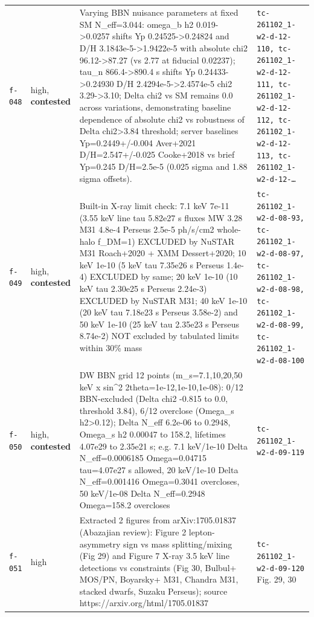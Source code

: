 \documentclass[11pt,a4paper]{article}
\begin{document}
\begin{longtable}{@{}p{}p{}p{}p{}@{}}
\texttt{f-048} & high, \textbf{contested} & Varying BBN nuisance parameters at fixed SM N\_eff=3.044: omega\_b h2 0.019-\textgreater{}0.0257 shifts Yp 0.24525-\textgreater{}0.24824 and D/H 3.1843e-5-\textgreater{}1.9422e-5 with absolute chi2 96.12-\textgreater{}87.27 (vs 2.77 at fiducial 0.02237); tau\_n 866.4-\textgreater{}890.4 s shifts Yp 0.24433-\textgreater{}0.24930 D/H 2.4294e-5-\textgreater{}2.4574e-5 chi2 3.29-\textgreater{}3.10; Delta chi2 vs SM remains 0.0 across variations, demonstrating baseline dependence of absolute chi2 vs robustness of Delta chi2\textgreater{}3.84 threshold; server baselines Yp=0.2449+/-0.004 Aver+2021 D/H=2.547+/-0.025 Cooke+2018 vs brief Yp=0.245 D/H=2.5e-5 (0.025 sigma and 1.88 sigma offsets). & \texttt{tc-261102\_\allowbreak{}1-w2-d-12-110,\allowbreak{} tc-261102\_\allowbreak{}1-w2-d-12-111,\allowbreak{} tc-261102\_\allowbreak{}1-w2-d-12-112,\allowbreak{} tc-261102\_\allowbreak{}1-w2-d-12-113,\allowbreak{} tc-261102\_\allowbreak{}1-w2-d-12-\ldots{}\allowbreak{}} \\
\texttt{f-049} & high, \textbf{contested} & Built-in X-ray limit check: 7.1 keV 7e-11 (3.55 keV line tau 5.82e27 s fluxes MW 3.28 M31 4.8e-4 Perseus 2.5e-5 ph/s/cm2 whole-halo f\_DM=1) EXCLUDED by NuSTAR M31 Roach+2020 + XMM Dessert+2020; 10 keV 1e-10 (5 keV tau 7.35e26 s Perseus 1.4e-4) EXCLUDED by same; 20 keV 1e-10 (10 keV tau 2.30e25 s Perseus 2.24e-3) EXCLUDED by NuSTAR M31; 40 keV 1e-10 (20 keV tau 7.18e23 s Perseus 3.58e-2) and 50 keV 1e-10 (25 keV tau 2.35e23 s Perseus 8.74e-2) NOT excluded by tabulated limits within 30\% mass & \texttt{tc-261102\_\allowbreak{}1-w2-d-08-93,\allowbreak{} tc-261102\_\allowbreak{}1-w2-d-08-97,\allowbreak{} tc-261102\_\allowbreak{}1-w2-d-08-98,\allowbreak{} tc-261102\_\allowbreak{}1-w2-d-08-99,\allowbreak{} tc-261102\_\allowbreak{}1-w2-d-08-100} \\
\texttt{f-050} & high, \textbf{contested} & DW BBN grid 12 points (m\_s=7.1,10,20,50 keV x sin\textasciicircum{}2 2theta=1e-12,1e-10,1e-08): 0/12 BBN-excluded (Delta chi2 -0.815 to 0.0, threshold 3.84), 6/12 overclose (Omega\_s h2\textgreater{}0.12); Delta N\_eff 6.2e-06 to 0.2948, Omega\_s h2 0.00047 to 158.2, lifetimes 4.07e29 to 2.35e21 s; e.g. 7.1 keV/1e-10 Delta N\_eff=0.0006185 Omega=0.04715 tau=4.07e27 s allowed, 20 keV/1e-10 Delta N\_eff=0.001416 Omega=0.3041 overcloses, 50 keV/1e-08 Delta N\_eff=0.2948 Omega=158.2 overcloses & \texttt{tc-261102\_\allowbreak{}1-w2-d-09-119} \\
\texttt{f-051} & high & Extracted 2 figures from arXiv:1705.01837 (Abazajian review): Figure 2 lepton-asymmetry sign vs mass splitting/mixing (Fig 29) and Figure 7 X-ray 3.5 keV line detections vs constraints (Fig 30, Bulbul+ MOS/PN, Boyarsky+ M31, Chandra M31, stacked dwarfs, Suzaku Perseus); source https://arxiv.org/html/1705.01837 & \texttt{tc-261102\_\allowbreak{}1-w2-d-09-120} Fig. 29, 30 \\

\end{longtable}
\end{document}
